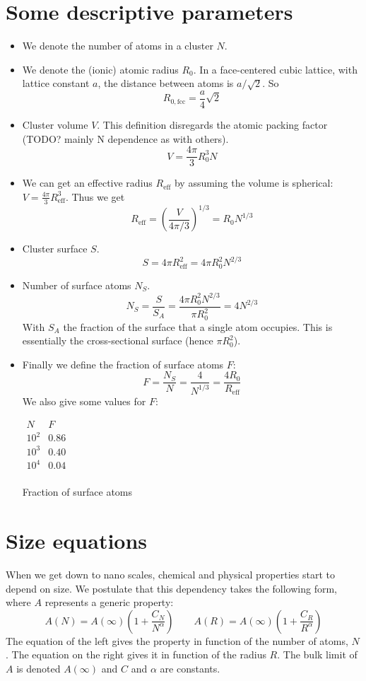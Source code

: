 \chapter{Some descriptive parameters}
\begin{itemize}
\item We denote the number of atoms in a cluster $N$.
\item We denote the (ionic) atomic radius $R_0$. In a face-centered cubic lattice, with lattice constant $a$, the distance between atoms is $a/\sqrt{2}$. So
\[ R_{0,\text{fcc}} = \frac{a}{4}\sqrt{2} \]
\item Cluster volume $V$. This definition disregards the atomic packing factor (TODO? mainly N dependence as with others).
\[ V =  \frac{4\pi}{3}R_0^3N \]
\item We can get an effective radius $R_\text{eff}$ by assuming the volume is spherical: $V = \frac{4\pi}{3}R_\text{eff}^3$. Thus we get
\[ R_\text{eff} = \left(\frac{V}{4\pi/3}\right)^{1/3} = R_0 N^{1/3} \]
\item Cluster surface $S$.
\[ S = 4\pi R^2_\text{eff} = 4\pi R_0^2N^{2/3} \]
\item Number of surface atoms $N_S$.
\[ N_S = \frac{S}{S_A} = \frac{4\pi R_0^2 N^{2/3}}{\pi R_0^2} = 4 N^{2/3} \]
With $S_A$ the fraction of the surface that a single atom occupies. This is essentially the cross-sectional surface (hence $\pi R_0^2$).
\item Finally we define the fraction of surface atoms $F$:
\[ F = \frac{N_S}{N} = \frac{4}{N^{1/3}} = \frac{4R_0}{R_\text{eff}} \]
We also give some values for $F$:
\begin{table}[h]
  \centering
  $\begin{array}{c|c}
    N & F\\
	\hline
	10^2 & 0.86\\
    10^3 & 0.40\\
    10^4 & 0.04\\
  \end{array}$
  \caption{Fraction of surface atoms}
  \label{surfaceAtomFraction}
\end{table}
\end{itemize}

\chapter{Size equations}
When we get down to nano scales, chemical and physical properties start to depend on size. We postulate that this dependency takes the following form, where $A$ represents a generic property:
\[ A(N) = A(\infty) \left(1+\frac{C_N}{N^\alpha}\right) \qquad A(R) = A(\infty) \left(1+\frac{C_R}{R^\alpha}\right) \]
The equation of the left gives the property in function of the number of atoms, $N$. The equation on the right gives it in function of the radius $R$. The bulk limit of $A$ is denoted $A(\infty)$ and $C$ and $\alpha$ are constants.

